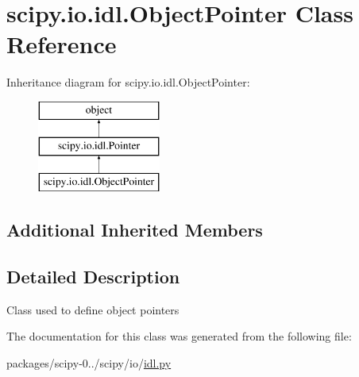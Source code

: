 \hypertarget{classscipy_1_1io_1_1idl_1_1ObjectPointer}{}\section{scipy.\+io.\+idl.\+Object\+Pointer Class Reference}
\label{classscipy_1_1io_1_1idl_1_1ObjectPointer}
Inheritance diagram for scipy.\+io.\+idl.\+Object\+Pointer\+:\begin{figure}[H]
\begin{center}
\leavevmode
\includegraphics[height=3.000000cm]{classscipy_1_1io_1_1idl_1_1ObjectPointer}
\end{center}
\end{figure}
\subsection*{Additional Inherited Members}


\subsection{Detailed Description}
\begin{DoxyVerb}Class used to define object pointers\end{DoxyVerb}
 

The documentation for this class was generated from the following file\+:\begin{DoxyCompactItemize}
\item 
packages/scipy-\/0../scipy/io/\hyperlink{idl_8py}{idl.\+py}\end{DoxyCompactItemize}
